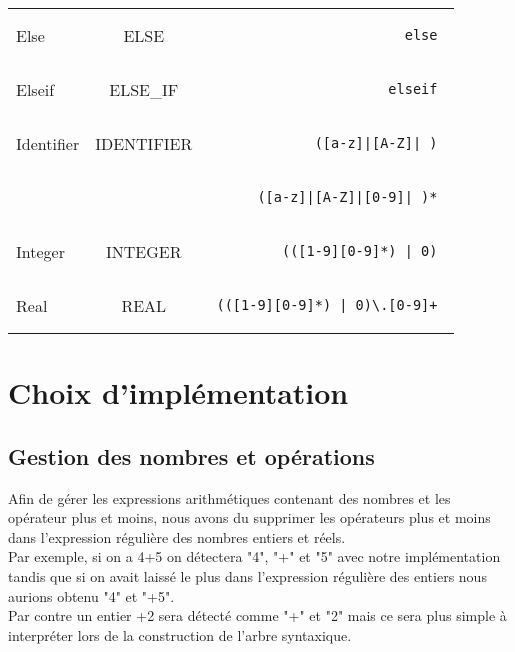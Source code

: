 \documentclass[a4paper,10pt]{article}
\begin{document}
\begin{tabular}{|l|c|r|}
Else & ELSE & \begin{minipage}{2in} \begin{verbatim} else \end{verbatim} \end{minipage} \\
Elseif & ELSE\_IF & \begin{minipage}{2in} \begin{verbatim} elseif \end{verbatim} \end{minipage} \\
Identifier & IDENTIFIER & \begin{minipage}{2in} \begin{verbatim} ([a-z]|[A-Z]|_) \end{verbatim} \end{minipage} \\
 &  & \begin{minipage}{2in} \begin{verbatim} ([a-z]|[A-Z]|[0-9]|_)* \end{verbatim} \end{minipage} \\
Integer & INTEGER & \begin{minipage}{2in} \begin{verbatim} (([1-9][0-9]*) | 0) \end{verbatim} \end{minipage} \\
Real & REAL & \begin{minipage}{2in} \begin{verbatim} (([1-9][0-9]*) | 0)\.[0-9]+ \end{verbatim} \end{minipage} \\
  \hline
\end{tabular}

\section{Choix d'implémentation}

\subsection{Gestion des nombres et opérations}

Afin de gérer les expressions arithmétiques contenant des nombres et les opérateur plus et moins, nous avons du supprimer les opérateurs plus et moins dans l'expression régulière des nombres entiers et réels.\\
Par exemple, si on a 4+5 on détectera "4", "+" et "5" avec notre implémentation tandis que si on avait laissé le plus dans l'expression régulière des entiers nous aurions obtenu "4" et "+5".\\
Par contre un entier +2 sera détecté comme "+" et "2" mais ce sera plus simple à interpréter lors de la construction de l'arbre syntaxique.
\end{document}

